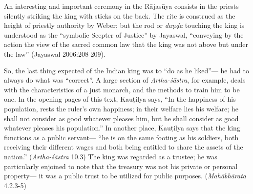 An interesting and important ceremony in the Rājasūya consists in the priests silently striking the king with sticks on the back. The rite is construed as the height of priestly authority by Weber; but the rod or {\sl daṇḍa} touching the king is understood as the “symbolic Scepter of Justice” by Jayaswal, “conveying by the action the view of the sacred common law that the king was not above but under the law” (Jayaswal 2006:208-209). 

So, the last thing expected of the Indian king was to “do as he liked”--- he had to always do what was “correct”. A large section of {\sl Artha-śāstra}, for example, deals with the characteristics of a just monarch, and the methods to train him to be one. In the opening pages of this text, Kauṭilya says, “In the happiness of his population, rests the ruler’s own happiness; in their welfare lies his welfare; he shall not consider as good whatever pleases him, but he shall consider as good whatever pleases his population.” In another place, Kauṭilya says that the king functions as a public servant--- “he is on the same footing as his soldiers, both receiving their different wages and both being entitled to share the assets of the nation.” ({\sl Artha-śāstra} 10.3) The king was regarded as a trustee; he was particularly enjoined to note that the treasury was not his private or personal property--- it was a public trust to be utilized for public purposes. ({\sl Mahābhārata} 4.2.3-5)

